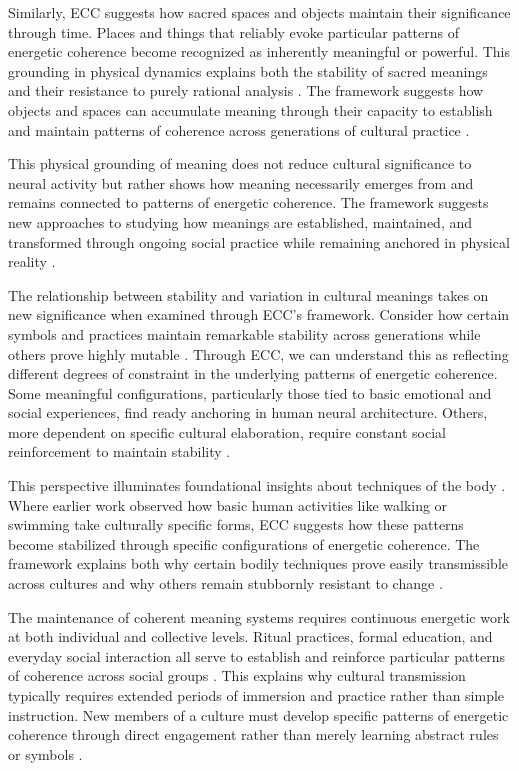 Similarly, ECC suggests how sacred spaces and objects maintain their significance through time. Places and things that reliably evoke particular patterns of energetic coherence become recognized as inherently meaningful or powerful. This grounding in physical dynamics explains both the stability of sacred meanings and their resistance to purely rational analysis \cite{eliade1959sacred}. The framework suggests how objects and spaces can accumulate meaning through their capacity to establish and maintain patterns of coherence across generations of cultural practice \cite{keane2003semiotics}.

This physical grounding of meaning does not reduce cultural significance to neural activity but rather shows how meaning necessarily emerges from and remains connected to patterns of energetic coherence. The framework suggests new approaches to studying how meanings are established, maintained, and transformed through ongoing social practice while remaining anchored in physical reality \cite{csordas1990embodiment}.

The relationship between stability and variation in cultural meanings takes on new significance when examined through ECC's framework. Consider how certain symbols and practices maintain remarkable stability across generations while others prove highly mutable \cite{sperber1996explaining}. Through ECC, we can understand this as reflecting different degrees of constraint in the underlying patterns of energetic coherence. Some meaningful configurations, particularly those tied to basic emotional and social experiences, find ready anchoring in human neural architecture. Others, more dependent on specific cultural elaboration, require constant social reinforcement to maintain stability \cite{boyer1994naturalness}.

This perspective illuminates foundational insights about techniques of the body \cite{bourdieu1990logic}. Where earlier work observed how basic human activities like walking or swimming take culturally specific forms, ECC suggests how these patterns become stabilized through specific configurations of energetic coherence. The framework explains both why certain bodily techniques prove easily transmissible across cultures and why others remain stubbornly resistant to change \cite{ingold2000perception}.

The maintenance of coherent meaning systems requires continuous energetic work at both individual and collective levels. Ritual practices, formal education, and everyday social interaction all serve to establish and reinforce particular patterns of coherence across social groups \cite{hutchins1995cognition}. This explains why cultural transmission typically requires extended periods of immersion and practice rather than simple instruction. New members of a culture must develop specific patterns of energetic coherence through direct engagement rather than merely learning abstract rules or symbols \cite{tomasello1999cultural}.

